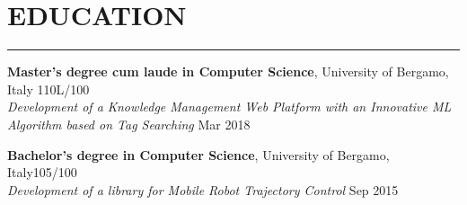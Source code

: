 \documentclass[10pt]{article}
\newcommand{\cvsection}[1]{\section*{\centering\normalsize\uppercase{#1}}\vspace{-16pt}\rule{\linewidth}{0.2pt}\vspace{6pt}}
\begin{document}
\cvsection{education}
\textbf{Master's degree cum laude in Computer Science}, University of Bergamo, Italy \hfill 110L\slash100 \\
\textit{Development of a Knowledge Management Web Platform with an Innovative ML Algorithm based on Tag Searching} \hfill Mar 2018

\vspace{6pt} %

\textbf{Bachelor's degree in Computer Science}, University of Bergamo, Italy\hfill 105\slash100 \\
\textit{Development of a library for Mobile Robot Trajectory Control} \hfill Sep 2015


\clearpage

\end{document}
